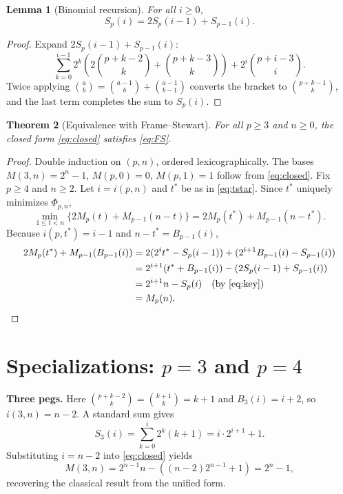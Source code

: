 \documentclass[11pt]{article}
\newtheorem{theorem}{Theorem}
\newtheorem{lemma}[theorem]{Lemma}
\theoremstyle{definition}
\begin{document}
\begin{lemma}[Binomial recursion]\label{lem:key}
For all $i \geq 0$,
\begin{equation}\label{eq:key}
S_p(i) = 2S_p(i-1) + S_{p-1}(i).
\end{equation}
\end{lemma}

\begin{proof}
Expand $2S_p(i-1) + S_{p-1}(i)$:
\[
\sum_{k=0}^{i-1} 2^k\left(2\binom{p+k-2}{k} + \binom{p+k-3}{k}\right) + 2^i\binom{p+i-3}{i}.
\]
Twice applying $\binom{a}{b} = \binom{a-1}{b} + \binom{a-1}{b-1}$ converts the bracket to $\binom{p+k-1}{k}$, and the last term completes the sum to $S_p(i)$.
\end{proof}

\begin{theorem}[Equivalence with Frame--Stewart]\label{thm:equiv}
For all $p \geq 3$ and $n \geq 0$, the closed form \eqref{eq:closed} satisfies \eqref{eq:FS}.
\end{theorem}

\begin{proof}
Double induction on $(p,n)$, ordered lexicographically. The bases $M(3,n) = 2^n - 1$, $M(p,0) = 0$, $M(p,1) = 1$ follow from \eqref{eq:closed}. Fix $p \geq 4$ and $n \geq 2$. Let $i = i(p,n)$ and $t^*$ be as in \eqref{eq:tstar}. Since $t^*$ uniquely minimizes $\Phi_{p,n}$,
\[
\min_{1 \leq t < n} \{2M_p(t) + M_{p-1}(n-t)\} = 2M_p(t^*) + M_{p-1}(n-t^*).
\]
Because $i(p,t^*) = i-1$ and $n - t^* = B_{p-1}(i)$,
\begin{align*}
2M_p(t^*) + M_{p-1}(B_{p-1}(i)) &= 2(2^i t^* - S_p(i-1)) + (2^{i+1}B_{p-1}(i) - S_{p-1}(i)) \\
&= 2^{i+1}(t^* + B_{p-1}(i)) - (2S_p(i-1) + S_{p-1}(i)) \\
&= 2^{i+1}n - S_p(i) \quad \text{(by \eqref{eq:key})} \\
&= M_p(n). \qedhere
\end{align*}
\end{proof}

\section{Specializations: $p=3$ and $p=4$}

\textbf{Three pegs.} Here $\binom{p+k-2}{k} = \binom{k+1}{k} = k+1$ and $B_3(i) = i+2$, so $i(3,n) = n-2$. A standard sum gives
\begin{equation}\label{eq:S3}
S_3(i) = \sum_{k=0}^{i} 2^k(k+1) = i \cdot 2^{i+1} + 1.
\end{equation}
Substituting $i = n-2$ into \eqref{eq:closed} yields
\[
M(3,n) = 2^{n-1}n - ((n-2)2^{n-1} + 1) = 2^n - 1,
\]
recovering the classical result from the unified form.
\end{document}
